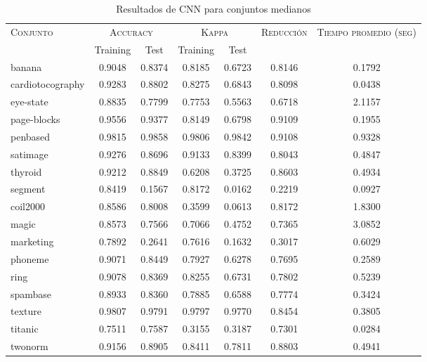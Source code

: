 \begin{table}[]
\centering
\begin{tabular}{l c c c c c c}
\hline
\multirow{2}{*}{\textsc{Conjunto}}
	& \multicolumn{2}{c}{\textsc{Accuracy}}
	& \multicolumn{2}{c}{\textsc{Kappa}}
	& \textsc{Reducción}
	& \textsc{Tiempo promedio (seg)} \\
	& Training & Test
	& Training & Test \\ 
\hline
\hline

banana & 0.9048 & 0.8374 & 0.8185 & 0.6723 & 0.8146 & 0.1792 \\
cardiotocography & 0.9283 & 0.8802 & 0.8275 & 0.6843 & 0.8098 & 0.0438 \\
eye-state & 0.8835 & 0.7799 & 0.7753 & 0.5563 & 0.6718 & 2.1157 \\
page-blocks & 0.9556 & 0.9377 & 0.8149 & 0.6798 & 0.9109 & 0.1955 \\
penbased & 0.9815 & 0.9858 & 0.9806 & 0.9842 & 0.9108 & 0.9328 \\
satimage & 0.9276 & 0.8696 & 0.9133 & 0.8399 & 0.8043 & 0.4847 \\
thyroid & 0.9212 & 0.8849 & 0.6208 & 0.3725 & 0.8603 & 0.4934 \\
segment & 0.8419 & 0.1567 & 0.8172 & 0.0162 & 0.2219 & 0.0927 \\
coil2000 & 0.8586 & 0.8008 & 0.3599 & 0.0613 & 0.8172 & 1.8300 \\
magic & 0.8573 & 0.7566 & 0.7066 & 0.4752 & 0.7365 & 3.0852 \\
marketing & 0.7892 & 0.2641 & 0.7616 & 0.1632 & 0.3017 & 0.6029 \\
phoneme & 0.9071 & 0.8449 & 0.7927 & 0.6278 & 0.7695 & 0.2589 \\
ring & 0.9078 & 0.8369 & 0.8255 & 0.6731 & 0.7802 & 0.5239 \\
spambase & 0.8933 & 0.8360 & 0.7885 & 0.6588 & 0.7774 & 0.3424 \\
texture & 0.9807 & 0.9791 & 0.9797 & 0.9770 & 0.8454 & 0.3805 \\
titanic & 0.7511 & 0.7587 & 0.3155 & 0.3187 & 0.7301 & 0.0284 \\
twonorm & 0.9156 & 0.8905 & 0.8411 & 0.7811 & 0.8803 & 0.4941 \\

\hline
\end{tabular}
\caption{Resultados de CNN para conjuntos medianos }
\label{res-med-cnn}
\end{table}

